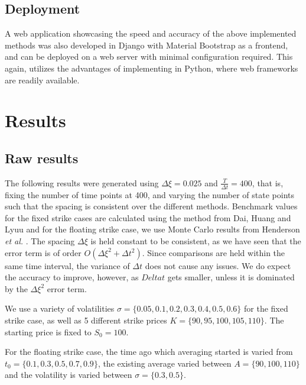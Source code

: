 \documentclass[12pt]{report}
\begin{document}
\section{Deployment}
A web application showcasing the speed and accuracy of the above implemented methods was also developed in Django with Material Bootstrap as a frontend, and can be deployed on a web server with minimal configuration required. This again, utilizes the advantages of implementing in Python, where web frameworks are readily available.

\chapter{Results}

\section{Raw results}
The following results were generated using \(\Delta\xi = 0.025\) and \(\frac{T}{\Delta t} = 400\), that is, fixing the number of time points at 400, and varying the number of state points such that the spacing is consistent over the different methods. Benchmark values for the fixed strike cases are calculated using the method from Dai, Huang and Lyuu \cite{dai_et_al} and for the floating strike case, we use Monte Carlo results from Henderson \textit{et al.} \cite{henderson_et_al}. The spacing \(\Delta\xi\) is held constant to be consistent, as we have seen that the error term is of order \(O(\Delta\xi^2 + \Delta t^2)\). Since comparisons are held within the same time interval, the variance of \(\Delta t\) does not cause any issues. We do expect the accuracy to improve, however, as \(Delta t\) gets smaller, unless it is dominated by the \(\Delta\xi^2\) error term.

We use a variety of volatilities \(\sigma = \{0.05, 0.1, 0.2, 0.3, 0.4, 0.5, 0.6\}\) for the fixed strike case, as well as 5 different strike prices \(K = \{90, 95, 100, 105, 110\}\). The starting price is fixed to \(S_0 = 100\).

For the floating strike case, the time ago which averaging started is varied from \(t_0 = \{0.1, 0.3, 0.5, 0.7, 0.9\}\), the existing average varied between \(A = \{90, 100, 110\}\) and the volatility is varied between \(\sigma = \{0.3, 0.5\}\).
\end{document}
